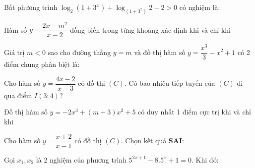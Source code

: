 \begin{question}%
Bất phương trình $\log_2\left(1+3^x\right)+\log_{\left(1+3^x\right)}2-2>0$ có nghiệm là:
\datcot
\bonpa
{}
{}
{}
{}
\end{question}

\begin{question}%
Hàm số $y=\dfrac{2x-m^2}{x-2}$ đồng biến trong từng khoảng xác định khi và chỉ khi
\datcot
\bonpa
{}
{}
{}
{}
\end{question}

\begin{question}%
Giá trị $m<0$ sao cho đường thẳng $y=m$ và đồ thị hàm số $y=\dfrac{x^3}{3}-x^2+1$ có 2 điểm chung phân biệt là:
\datcot
\bonpa
{}
{}
{}
{}
\end{question}

\begin{question}%
Cho hàm số $y=\dfrac{4x-2}{x-3}$ có đồ thị $(C)$. Có bao nhiêu tiếp tuyến của $(C)$ đi qua điểm $I(3;4)$?
\vspace{0.2cm}
\datcot
\bonpa
{}
{}
{}
{}
\end{question}

\begin{question}%
Đồ thị hàm số $y=-2x^3+(m+3)x^2+5$ có duy nhất 1 điểm cực trị khi và chỉ khi
\vspace{0.2cm}
\datcot
\bonpa
{}
{}
{}
{}
\end{question}

\begin{question}%
Cho hàm số $y=\dfrac{x+2}{x-1}$ có đồ thị $(C)$. Chọn kết quả \textbf{SAI}:
\vspace{0.2cm}
\datcot[4]
\bonpa
{}
{}
{}
{}
\end{question}

\begin{question}%
Gọi $x_1, x_2$ là 2 nghiệm của phương trình $5^{2x+1}-8.5^x+1=0$. Khi đó:
\vspace{0.2cm}
\datcot
\bonpa
{}
{}
{}
{}
\end{question}

